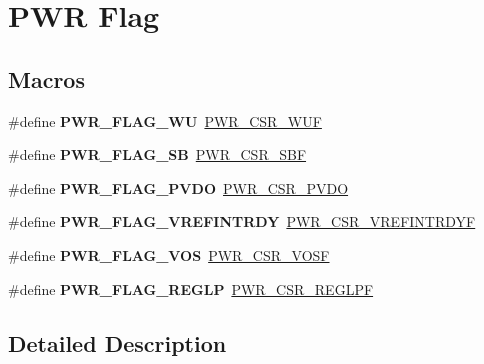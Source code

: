 \hypertarget{group___p_w_r___flag}{\section{P\-W\-R Flag}
\label{group___p_w_r___flag}
}
\subsection*{Macros}
\begin{DoxyCompactItemize}
\item 
\hypertarget{group___p_w_r___flag_ga2d06760a5769e729b06d41e37036d58e}{\#define {\bfseries P\-W\-R\-\_\-\-F\-L\-A\-G\-\_\-\-W\-U}~\hyperlink{group___peripheral___registers___bits___definition_ga9465bb7ad9ca936688344e2a077539e6}{P\-W\-R\-\_\-\-C\-S\-R\-\_\-\-W\-U\-F}}\label{group___p_w_r___flag_ga2d06760a5769e729b06d41e37036d58e}

\item 
\hypertarget{group___p_w_r___flag_ga9e55f0b5dec2346d5c8dee3ab3c0c2df}{\#define {\bfseries P\-W\-R\-\_\-\-F\-L\-A\-G\-\_\-\-S\-B}~\hyperlink{group___peripheral___registers___bits___definition_gab4fd42f153660593cad6f4fe22ff76bb}{P\-W\-R\-\_\-\-C\-S\-R\-\_\-\-S\-B\-F}}\label{group___p_w_r___flag_ga9e55f0b5dec2346d5c8dee3ab3c0c2df}

\item 
\hypertarget{group___p_w_r___flag_gaefd05d58cc050eeef83a1b5c520b2c2a}{\#define {\bfseries P\-W\-R\-\_\-\-F\-L\-A\-G\-\_\-\-P\-V\-D\-O}~\hyperlink{group___peripheral___registers___bits___definition_ga3535ce181895cc00afeb28dcac68d04c}{P\-W\-R\-\_\-\-C\-S\-R\-\_\-\-P\-V\-D\-O}}\label{group___p_w_r___flag_gaefd05d58cc050eeef83a1b5c520b2c2a}

\item 
\hypertarget{group___p_w_r___flag_gaac035bea888dba9563d75727e655b564}{\#define {\bfseries P\-W\-R\-\_\-\-F\-L\-A\-G\-\_\-\-V\-R\-E\-F\-I\-N\-T\-R\-D\-Y}~\hyperlink{group___peripheral___registers___bits___definition_ga918aa3e6e5f97f7032d3eae8ac324eba}{P\-W\-R\-\_\-\-C\-S\-R\-\_\-\-V\-R\-E\-F\-I\-N\-T\-R\-D\-Y\-F}}\label{group___p_w_r___flag_gaac035bea888dba9563d75727e655b564}

\item 
\hypertarget{group___p_w_r___flag_ga023927a5157d09b160a2ac39064e4b97}{\#define {\bfseries P\-W\-R\-\_\-\-F\-L\-A\-G\-\_\-\-V\-O\-S}~\hyperlink{group___peripheral___registers___bits___definition_ga760e9fa30782fc54fec0b0f886eda0f1}{P\-W\-R\-\_\-\-C\-S\-R\-\_\-\-V\-O\-S\-F}}\label{group___p_w_r___flag_ga023927a5157d09b160a2ac39064e4b97}

\item 
\hypertarget{group___p_w_r___flag_ga76af01156a4a4fbac64b2c00e25caddb}{\#define {\bfseries P\-W\-R\-\_\-\-F\-L\-A\-G\-\_\-\-R\-E\-G\-L\-P}~\hyperlink{group___peripheral___registers___bits___definition_gafb4741c79606f7fde43e2b88113053d7}{P\-W\-R\-\_\-\-C\-S\-R\-\_\-\-R\-E\-G\-L\-P\-F}}\label{group___p_w_r___flag_ga76af01156a4a4fbac64b2c00e25caddb}

\end{DoxyCompactItemize}


\subsection{Detailed Description}
